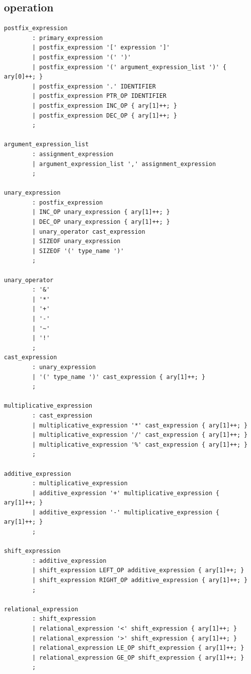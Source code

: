 \documentclass{article}
\begin{document}
\subsection{operation}
\begin{verbatim}
postfix_expression
        : primary_expression
        | postfix_expression '[' expression ']'
        | postfix_expression '(' ')'
        | postfix_expression '(' argument_expression_list ')' { ary[0]++; }
        | postfix_expression '.' IDENTIFIER
        | postfix_expression PTR_OP IDENTIFIER
        | postfix_expression INC_OP { ary[1]++; }
        | postfix_expression DEC_OP { ary[1]++; }
        ;

argument_expression_list
        : assignment_expression
        | argument_expression_list ',' assignment_expression
        ;

unary_expression
        : postfix_expression
        | INC_OP unary_expression { ary[1]++; }
        | DEC_OP unary_expression { ary[1]++; }
        | unary_operator cast_expression
        | SIZEOF unary_expression
        | SIZEOF '(' type_name ')'
        ;

unary_operator
        : '&'
        | '*'
        | '+'
        | '-'
        | '~'
        | '!'
        ;
cast_expression
        : unary_expression
        | '(' type_name ')' cast_expression { ary[1]++; }
        ;

multiplicative_expression
        : cast_expression
        | multiplicative_expression '*' cast_expression { ary[1]++; }
        | multiplicative_expression '/' cast_expression { ary[1]++; }
        | multiplicative_expression '%' cast_expression { ary[1]++; }
        ;

additive_expression
        : multiplicative_expression
        | additive_expression '+' multiplicative_expression { ary[1]++; }
        | additive_expression '-' multiplicative_expression { ary[1]++; }
        ;

shift_expression
        : additive_expression
        | shift_expression LEFT_OP additive_expression { ary[1]++; }
        | shift_expression RIGHT_OP additive_expression { ary[1]++; }
        ;

relational_expression
        : shift_expression
        | relational_expression '<' shift_expression { ary[1]++; }
        | relational_expression '>' shift_expression { ary[1]++; }
        | relational_expression LE_OP shift_expression { ary[1]++; }
        | relational_expression GE_OP shift_expression { ary[1]++; }
        ;


\end{verbatim}
\end{document}
